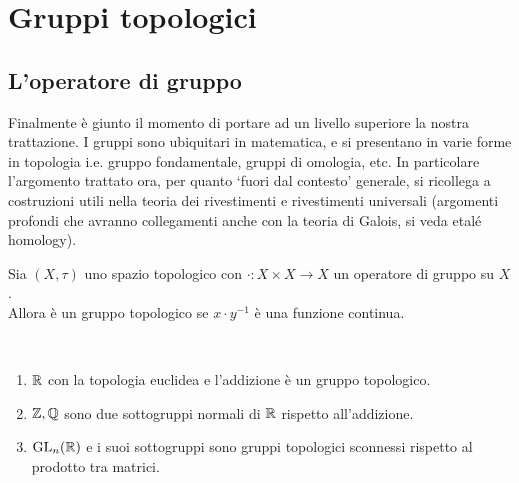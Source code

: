 \section{Gruppi topologici}
\subsection{\textcolor{TopGener}{\textbf{L'operatore di gruppo}}}

Finalmente è giunto il momento di portare ad un livello superiore la nostra trattazione. I gruppi sono ubiquitari in matematica, e si presentano in varie forme in topologia i.e. gruppo fondamentale, gruppi di omologia, etc. In particolare l'argomento trattato ora, per quanto `fuori dal contesto' generale, si ricollega a costruzioni utili nella teoria dei rivestimenti e rivestimenti universali (argomenti profondi che avranno collegamenti anche con la teoria di Galois, si veda etalé homology).  


\begin{definition}
	Sia $(X, \tau)$ uno spazio topologico con $\cdot \colon X \times X \rightarrow X$ un operatore di gruppo su $X$. \\ Allora è un gruppo topologico se $x \cdot y^{-1}$ è una funzione continua.
\end{definition}

\begin{example} \
\begin{enumerate}
	\item $\mathbb{R}$ con la topologia euclidea e l'addizione è un gruppo topologico.
	\item $\mathbb{Z}, \mathbb{Q}$ sono due sottogruppi normali di $\mathbb{R}$ rispetto all'addizione. 
	\item $\operatorname{GL}_n(\mathbb{R})$ e i suoi sottogruppi sono gruppi topologici sconnessi rispetto al prodotto tra matrici.
\end{enumerate}
\end{example}


